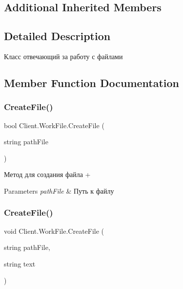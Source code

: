 \subsection*{Additional Inherited Members}


\subsection{Detailed Description}
Класс отвечающий за работу с файлами 



\subsection{Member Function Documentation}
\hypertarget{class_client_1_1_work_file_a2133a018059220ccb5eca90ea39f0f72}{}\label{class_client_1_1_work_file_a2133a018059220ccb5eca90ea39f0f72} 
\subsubsection{\texorpdfstring{Create\+File()}{CreateFile()}\hspace{0.1cm}{\footnotesize\ttfamily [1/2]}}
{\footnotesize\ttfamily bool Client.\+Work\+File.\+Create\+File (\begin{DoxyParamCaption}\item[{string}]{path\+File }\end{DoxyParamCaption})\hspace{0.3cm}{\ttfamily [inline]}}



Метод для создания файла + 


\begin{DoxyParams}{Parameters}
{\em path\+File} & Путь к файлу \\
\hline
\end{DoxyParams}
\hypertarget{class_client_1_1_work_file_a1a78c0750e5d9e3f6e47f2a18d73ad14}{}\label{class_client_1_1_work_file_a1a78c0750e5d9e3f6e47f2a18d73ad14} 
\subsubsection{\texorpdfstring{Create\+File()}{CreateFile()}\hspace{0.1cm}{\footnotesize\ttfamily [2/2]}}
{\footnotesize\ttfamily void Client.\+Work\+File.\+Create\+File (\begin{DoxyParamCaption}\item[{string}]{path\+File,  }\item[{string}]{text }\end{DoxyParamCaption})\hspace{0.3cm}{\ttfamily [inline]}}



